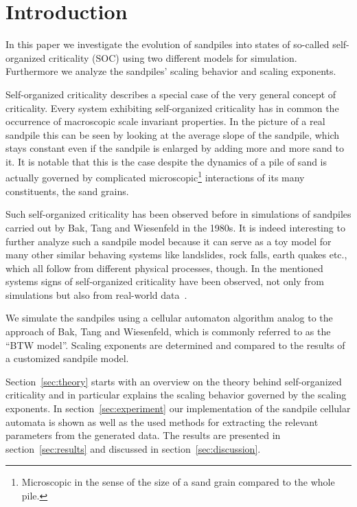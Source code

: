 \begin{abstract}
\dots\\
\dots\\
\dots
\end{abstract}

\maketitle

\section{Introduction}
\label{sec:intro}
In this paper we investigate the evolution of sandpiles into states of so-called self-organized criticality (SOC) using
two different models for simulation. Furthermore we analyze the sandpiles' scaling behavior and scaling exponents.

Self-organized criticality describes a special case of the very general concept of criticality. Every system
exhibiting self-organized criticality has in common the occurrence of macroscopic scale invariant properties.
In the picture of a real sandpile this can be seen by looking at the average slope of the sandpile,
which stays constant even if the sandpile is enlarged by adding more and more sand to it.
It is notable that this is the case despite the dynamics of a pile of sand is actually governed by complicated
microscopic\footnote{Microscopic in the sense of the size of a sand grain compared to the whole pile.} interactions
of its many constituents, the sand grains.

Such self-organized criticality has been observed before in simulations of sandpiles carried out by Bak, Tang and
Wiesenfeld in the 1980s. It is indeed interesting to further analyze such a sandpile model
because it can serve as a toy model for many other similar behaving systems like landslides, rock falls, earth quakes
etc., which all follow from different physical processes, though.
In the mentioned systems signs of self-organized criticality have been observed, not only from simulations but also
from real-world data~\cite{Hergarten}.

We simulate the sandpiles using a cellular automaton algorithm analog to the approach of Bak, Tang and Wiesenfeld,
which is commonly referred to as the \enquote{BTW model}. Scaling exponents are determined and compared to the
results of a customized sandpile model.

Section~\ref{sec:theory} starts with an overview on the theory behind self-organized criticality and in particular
explains the scaling behavior governed by the scaling exponents.
In section~\ref{sec:experiment} our implementation of the sandpile cellular automata is shown as well as
the used methods for extracting the relevant parameters from the generated data.
The results are presented in section~\ref{sec:results} and discussed in section~\ref{sec:discussion}.


